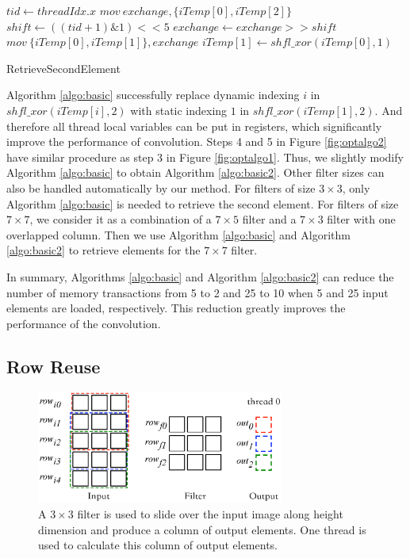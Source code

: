 \begin{algorithm}[t!]
	$tid \gets threadIdx.x$\;
	$mov\ exchange, \{iTemp[0], iTemp[2]\}$\;
	$shift \gets ((tid+1)\&1)<<5$\;
	$exchange \gets exchange >> shift$\;
	$mov\ \{iTemp[0],iTemp[1]\}, exchange$\;
	$iTemp[1] \gets shfl\_xor(iTemp[0],1)$\;	
	\caption{RetrieveSecondElement}
	\label{algo:basic2}
\end{algorithm}

Algorithm \ref{algo:basic} successfully replace dynamic indexing $i$ in $shfl\_xor(iTemp[i],2)$ with static indexing $1$ in $shfl\_xor(iTemp[1],2)$. {\color{red}And therefore all thread local variables can be put in registers,} which significantly improve the performance of convolution. Steps 4 and 5 in Figure \ref{fig:optalgo2} have similar procedure as step 3 in Figure \ref{fig:optalgo1}. Thus, we slightly modify Algorithm \ref{algo:basic} to obtain Algorithm \ref{algo:basic2}. {\color{red}Other filter sizes can also be handled automatically by our method. For filters of size $3 \times 3$, only Algorithm \ref{algo:basic} is needed to retrieve the second element. For filters of size $7 \times 7$, we consider it as a combination of a $7 \times 5$ filter and a $7 \times 3$ filter with one overlapped column. Then we use Algorithm \ref{algo:basic} and Algorithm \ref{algo:basic2} to retrieve elements for the $7 \times 7$ filter.}

In summary, Algorithms \ref{algo:basic} and Algorithm \ref{algo:basic2} can reduce the number of memory transactions from 5 to 2 and 25 to 10 when 5 and 25 input elements are loaded, respectively. This reduction greatly improves the performance of the convolution.

\subsection{Row Reuse}
\label{sec:rowreuse}
\begin{figure}
	\centering
	\includegraphics[width=0.9\columnwidth,height=3.7cm]{./figure/rowreuse.eps}
\caption{A $3 \times 3$ filter is used to slide over the input image along height dimension and produce a column of output elements. One thread is used to calculate this column of output elements.}
\label{fig:rowreuse}
\end{figure}

